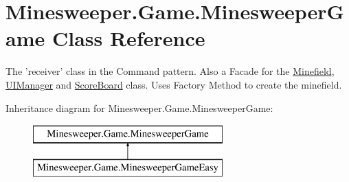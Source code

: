 \hypertarget{class_minesweeper_1_1_game_1_1_minesweeper_game}{\section{Minesweeper.\+Game.\+Minesweeper\+Game Class Reference}
\label{class_minesweeper_1_1_game_1_1_minesweeper_game}
}


The 'receiver' class in the Command pattern. Also a Facade for the \hyperlink{class_minesweeper_1_1_game_1_1_minefield}{Minefield}, \hyperlink{class_minesweeper_1_1_game_1_1_u_i_manager}{U\+I\+Manager} and \hyperlink{class_minesweeper_1_1_game_1_1_score_board}{Score\+Board} class. Uses Factory Method to create the minefield.  


Inheritance diagram for Minesweeper.\+Game.\+Minesweeper\+Game\+:\begin{figure}[H]
\begin{center}
\leavevmode
\includegraphics[height=2.000000cm]{class_minesweeper_1_1_game_1_1_minesweeper_game}
\end{center}
\end{figure}
